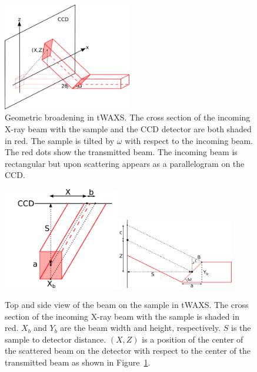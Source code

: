 \begin{figure}[htbp]
  \centering
  \includegraphics[width=0.5\textwidth]{figures/ripple/MMs/transmission/geometric_broadening1}
  \caption[Geometric broadening in tWAXS]{Geometric broadening in tWAXS. 
  The cross section of the incoming X-ray beam with the sample and the CCD 
  detector are both shaded in red. The sample is tilted by $\omega$
  with respect to the incoming beam.
  The red dots show the transmitted beam. The incoming beam is rectangular
  but upon scattering appears as a parallelogram on the CCD.}
  \label{fig:gb_trans1}
\end{figure}

\begin{figure}[htbp]
  \centering
  \includegraphics[width=0.45\textwidth]{figures/ripple/MMs/transmission/geometric_broadening2}
  \includegraphics[width=0.45\textwidth]{figures/ripple/MMs/transmission/geometric_broadening3}
  \caption[Top and side view of the beam on the sample in tWAXS]{Top and side 
  view of the beam on the sample in tWAXS. The cross section of the incoming X-ray 
  beam with the sample is shaded in red. 
  $X_b$ and $Y_b$ are the beam width and height, respectively. 
  $S$ is the sample to detector distance. 
  $(X,Z)$ is a  
	position of the center of the scattered beam on the detector with respect 
	to the center of the transmitted beam as shown in 
	Figure~\ref{fig:gb_trans1}.}
  \label{fig:gb_trans2}
\end{figure}

